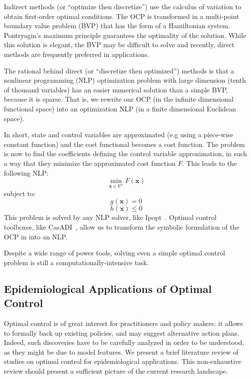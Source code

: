 \par Indirect methods (or ``optimize then discretize'') use the calculus of variation to obtain first-order optimal conditions. The OCP is transformed in a multi-point boundary value problem (BVP) that has the form of a Hamiltonian system. Pontryagin's maximum principle guarantees the optimality of the solution. While this solution is elegant, the BVP may be difficult to solve and recently, direct methods are frequently preferred in applications.

\par The rational behind direct (or ``discretize then optimized'') methods is that a nonlinear programming (NLP) optimization problem with large dimension (tenth of thousand variables) has an easier numerical solution than a simple BVP, because it is sparse. That is, we rewrite our OCP (in the infinite dimensional functional space) into an optimization NLP (in a finite dimensional Euclidean space). 

In short, state and control variables are approximated (e.g using a piece-wise constant function) and the cost functional becomes a cost function. The problem is now to find the coefficients defining the control variable approximation, in such a way that they minimize the approximated cost function $F$. This leads to the following NLP:
\begin{equation}
\min_{\textbf{x} \in \mathbb{R}^n} F(\textbf{x})
\end{equation}
subject to:
\begin{equation}
g(\textbf{x}) = 0
\end{equation}    
\begin{equation}
h(\textbf{x}) \leq 0
\end{equation}
This problem is solved by any NLP solver, like Ipopt~\cite{wachter_implementation_2006}.   Optimal control toolboxes, like CasADI~\cite{andersson_casadi:_2012}, allow us to transform the symbolic formulation of the OCP in into an NLP. 

Despite a wide range of power tools, solving even a simple  optimal control problem is still a computationally-intensive task.

\subsection{Epidemiological Applications of Optimal Control}

Optimal control is of great interest for practitioners and policy makers: it allows to formally back up existing policies, and may suggest alternative action plans. Indeed, such discoveries have to be carefully analyzed in order to be understood, as they might be due to model features. We present a brief literature review of studies on optimal control for epidemiological applications. This non-exhaustive review should present a sufficient picture of the current research landscape.

